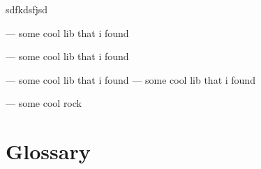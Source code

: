 \documentclass[12pt]{article}
\begin{document}
\tableofcontents
\newpage


sdfkdsfjsd


--- some cool lib that i found

 --- some cool lib that i found

 --- some cool lib that i found
 --- some cool lib that i found


 --- some cool rock







\newpage


\section{Glossary}
\glsaddall
\printglossary
\end{document}
